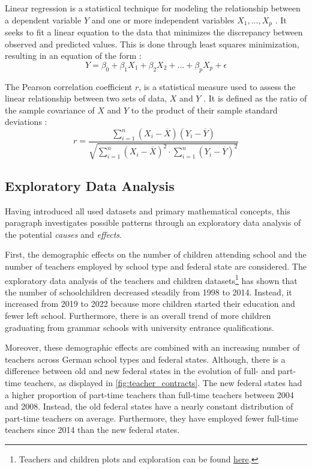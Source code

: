 Linear regression is a statistical technique for modeling the relationship between a dependent variable $Y$ and one or more independent variables $X_1,...,X_p$ \cite{james_introduction_2021}. It seeks to fit a linear equation to the data that minimizes the discrepancy between observed and predicted values. This is done through least squares minimization, resulting in an equation of the form \cite{james_introduction_2021}:
\begin{equation}
    Y = \beta_0 + \beta_1 X_1 + \beta_2 X_2 +  ...+ \beta_p X_p + \epsilon 
\end{equation}

The Pearson correlation coefficient $r$, is a statistical measure used to assess the linear relationship between two sets of data, $X$ and $Y$ \cite{rodgers_thirteen_1988}. It is defined as the ratio of the sample covariance of $X$ and $Y$ to the product of their sample standard deviations \cite{rodgers_thirteen_1988}:
\begin{equation}
    r = \frac{\sum_{i=1}^n (X_i - \overline{X}) (Y_i - \overline{Y})}{\sqrt{\sum_{i=1}^n(X_i-\overline{X})^2 \cdot \sum_{i=1}^n(Y_i-\overline{Y})^2}}
\end{equation}

\subsection{Exploratory Data Analysis}\label{sec:analysis}
Having introduced all used datasets and primary mathematical concepts, this paragraph investigates possible patterns through an exploratory data analysis of the potential \emph{causes} and \emph{effects}. 

First, the demographic effects on the number of children attending school and the number of teachers employed by school type and federal state are considered. The exploratory data analysis of the teachers and children datasets\footnote{\label{footnote:teachers-children}Teachers and children plots and exploration can be found \href{https://github.com/KarylReyne/DataLiteracyWS23/blob/main/exp/TF-005-TeachersToChildren.ipynb}{here}.} has shown that the number of schoolchildren decreased steadily from 1998 to 2014. Instead, it increased from 2019 to 2022 because more children started their education and fewer left school. Furthermore, there is an overall trend of more children graduating from grammar schools with university entrance qualifications.

Moreover, these demographic effects are combined with an increasing number of teachers across German school types and federal states. %
Although, there is a difference between old and new federal states in the evolution of full- and part-time teachers, as displayed in \autoref{fig:teacher_contracts}. The new federal states had a higher proportion of part-time teachers than full-time teachers between 2004 and 2008. Instead, the old federal states have a nearly constant distribution of part-time teachers on average. Furthermore, they have employed fewer full-time teachers since 2014 than the new federal states. 


